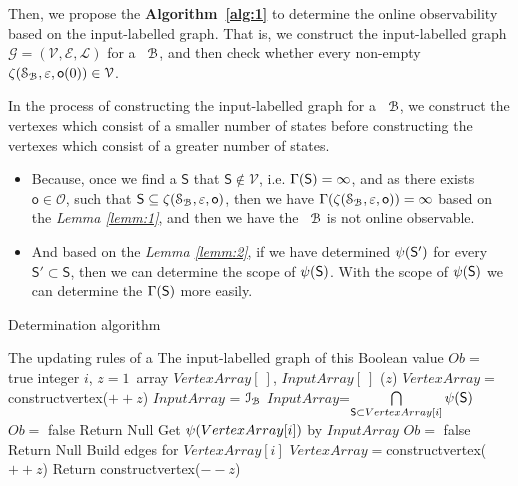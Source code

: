 
 Then, we propose the {\bf Algorithm~\ref{alg:1}} to determine the online observability based on the input-labelled graph. That is, we construct the input-labelled graph $\mathcal{G}=(\mathcal{V}, \mathcal{E}, \mathcal{L})$ for a \BCN\ ${\mathcal{B}}$, and then check whether every non-empty $\zeta(\mathcal{S}_{\mathcal{B}},\varepsilon, \mathsf{o}(0))\in \mathcal{V}$.
 
 In the process of constructing the input-labelled graph for a \BCN\ ${\mathcal{B}}$, we construct the vertexes which consist of a smaller number of states before constructing the vertexes which consist of a greater number of states.
\begin{itemize}
\item  Because, once we find a $\mathsf{S}$ that $\mathsf{S}\notin \mathcal{V}$, i.e. $\Gamma(\mathsf{S})= \infty$, and as there exists $\mathsf{o}\in \mathcal{O}$, such that $\mathsf{S}\subseteq \zeta(\mathcal{S}_{\mathcal{B}},\varepsilon, \mathsf{o})$, then we have $\Gamma(\zeta(\mathcal{S}_{\mathcal{B}},\varepsilon, \mathsf{o}))= \infty$ %
 based on the {\em Lemma \ref{lemm:1}}, and then we have the \BCN\ ${\mathcal{B}}$ is not online observable.
\item  And based on the {\em Lemma \ref{lemm:2}}, if we have determined $\psi(\mathsf{S}')$ for every $\mathsf{S}'\subset\mathsf{S}$, then we can determine the scope of $\psi(\mathsf{S})$. With the scope of $\psi(\mathsf{S})$ we can determine the $\Gamma(\mathsf{S})$ more easily.
 \end{itemize} %

\begin{algorithm}[h]
\caption{Determination algorithm}
\begin{algorithmic}[1]
\REQUIRE 
The updating rules of a \BCN
\ENSURE  
The input-labelled graph of this \BCN
\STATE Boolean value $Ob=$ true 
\STATE integer $i$, $z=1$\
\STATE array $VertexArray[\ ]$, $InputArray[\ ]$
($z$)
\STATE $VertexArray=${\sf constructvertex}($++z$)
\STATE $InputArray$ = $\mathcal{I}_{\mathcal{B}}$ 
\ELSE
\STATE $InputArray$=$\mathop{\bigcap}\limits_{\mathsf{S}\subset VertexArray[i]} \psi(\mathsf{S}) $ 
\IF{($InputArray==\emptyset$)}
\STATE  $Ob=$ false 
\STATE Return Null
\ENDIF
\ENDIF
\STATE Get $\psi(VertexArray[i])$ by $InputArray$ 
\STATE  $Ob=$ false 
\STATE Return Null
\ENDIF
\STATE Build edges for $VertexArray[i]$ 
\ENDFOR
\STATE $VertexArray=${\sf constructvertex}($++z$)
\ENDWHILE
\STATE Return {\sf constructvertex}($--z$)
\end{algorithmic}
 \label{alg:1}
\end{algorithm}


